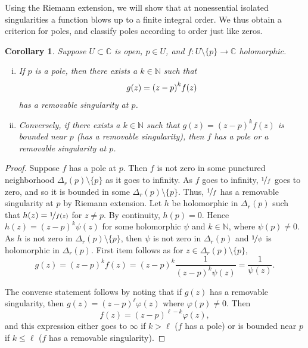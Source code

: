 \documentclass[12pt,openany]{book}
\newcommand{\avoidbreak}{\postdisplaypenalty=100}
\newcommand{\C}{{\mathbb{C}}}
\newcommand{\N}{{\mathbb{N}}}
\theoremstyle{plain}
\newtheorem{cor}[thm]{Corollary}
\theoremstyle{remark}
\theoremstyle{definition}
\theoremstyle{exercise}
\theoremstyle{example}
\begin{document}
Using the Riemann extension, we will show that
at nonessential isolated singularities
a function blows up to a finite integral order.
We thus obtain a criterion for poles, and classify
poles according to order just like zeros.

\begin{cor}
\pagebreak[2]
Suppose $U \subset \C$ is open, $p \in U$,
and $f \colon U \setminus \{p\} \to \C$ holomorphic.
\begin{enumerate}[(i)]
\item
If $p$ is a pole, then there exists a $k \in \N$ such that
\begin{equation*}
g(z) = {(z-p)}^k f(z)
\avoidbreak
\end{equation*}
has a removable singularity at $p$.
\item
Conversely, if there exists a $k \in \N$ such that
$g(z) = {(z-p)}^k f(z)$ is bounded near $p$ (has a removable singularity),
then $f$ has a pole or a
removable singularity at $p$.
\end{enumerate}
\end{cor}

\begin{proof}
Suppose $f$ has a pole at $p$.
Then $f$ is not zero in some
punctured neighborhood $\Delta_r(p) \setminus \{p\}$ as it goes to infinity.
As $f$ goes to infinity,
$\nicefrac{1}{f}$ goes to zero, and so it is bounded in some $\Delta_r(p)
\setminus \{p\}$.
Thus, $\nicefrac{1}{f}$ has a removable singularity at $p$ by Riemann extension.
Let $h$ be holomorphic in $\Delta_r(p)$
such that $h(z) = \nicefrac{1}{f(z)}$ for $z \not= p$.  By continuity, $h(p) =
0$.  Hence $h(z) = {(z-p)}^k \psi(z)$ for some holomorphic $\psi$ and $k \in \N$,
where $\psi(p) \not= 0$.
As $h$ is not zero in $\Delta_r(p) \setminus \{p\}$,
then $\psi$ is not zero in $\Delta_r(p)$
and $\nicefrac{1}{\psi}$ is holomorphic in $\Delta_r(p)$.
First item follows as
for $z \in \Delta_r(p) \setminus \{p\}$,
\begin{equation*}
g(z) = {(z-p)}^k f(z)
=
{(z-p)}^k \frac{1}{{(z-p)}^k \psi(z)}
=
\frac{1}{\psi(z)} .
\end{equation*}

The converse statement follows by noting that if $g(z)$ has a removable
singularity, then $g(z) = {(z-p)}^\ell \varphi(z)$ where
$\varphi(p) \not= 0$.
Then
\begin{equation*}
f(z) = {(z-p)}^{\ell-k} \varphi(z) ,
\end{equation*}
and this expression either goes to $\infty$ if $k > \ell$ ($f$ has a pole) or is
bounded near $p$ if $k \leq \ell$ ($f$ has a removable singularity).
\end{proof}
\end{document}
